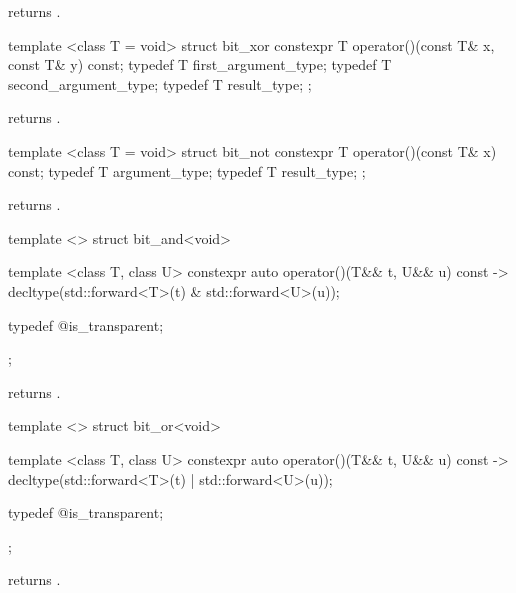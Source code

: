 \begin{itemdescr}
\pnum
{} returns .
\end{itemdescr}

%
\begin{itemdecl}
template <class T = void> struct bit_xor {
  constexpr T operator()(const T& x, const T& y) const;
  typedef T first_argument_type;
  typedef T second_argument_type;
  typedef T result_type;
};
\end{itemdecl}

\begin{itemdescr}
\pnum
{} returns .
\end{itemdescr}

\begin{itemdecl}
template <class T = void> struct bit_not {
  constexpr T operator()(const T& x) const;
  typedef T argument_type;
  typedef T result_type;
};
\end{itemdecl}

\begin{itemdescr}
\pnum
{} returns .
\end{itemdescr}

%
\begin{itemdecl}
template <> struct bit_and<void> {
  template <class T, class U> constexpr auto operator()(T&& t, U&& u) const
    -> decltype(std::forward<T>(t) & std::forward<U>(u));

  typedef @\unspec@ is_transparent;
};
\end{itemdecl}

\begin{itemdescr}
\pnum
{} returns .
\end{itemdescr}

%
\begin{itemdecl}
template <> struct bit_or<void> {
  template <class T, class U> constexpr auto operator()(T&& t, U&& u) const
    -> decltype(std::forward<T>(t) | std::forward<U>(u));

  typedef @\unspec@ is_transparent;
};
\end{itemdecl}

\begin{itemdescr}
\pnum
{} returns .
\end{itemdescr}

